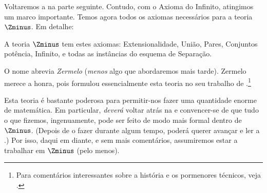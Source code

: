 \documentclass[../../../include/open-logic-section]{subfiles}
\begin{document}

Voltaremos a \stagesinf{} na parte seguinte. Contudo, com o
Axioma do Infinito, atingimos um marco importante. Temos agora
todos os axiomas necessários para a teoria $\Zminus$. Em detalhe:

\begin{defn}
A teoria $\Zminus$ tem estes axiomas: Extensionalidade, União, Pares, Conjuntos potência, Infinito, e todas as instâncias do esquema de Separação.
\end{defn}

O nome abrevia \emph{Zermelo} (\emph{menos} algo
que abordaremos mais tarde). Zermelo merece a honra, pois
formulou essencialmente esta teoria no seu trabalho de
\citeyear{Zermelo1908Untersuchungen}.\footnote{Para comentários interessantes
sobre a história e os pormenores técnicos, veja \citet[Apêndice
A]{Potter2004}.}

Esta teoria é bastante poderosa para permitir-nos fazer uma quantidade enorme de
matemática. Em particular, \emph{deverá} voltar atrás na
 e convencer-se de que tudo o que fizemos,
ingenuamente, pode ser feito de modo mais formal dentro de~$\Zminus$. (Depois de o fazer durante algum tempo, poderá querer avançar e ler a
.) Por isso, daqui em diante,
e sem mais comentários, assumiremos estar a trabalhar
em $\Zminus$ (pelo menos).
\end{document}
